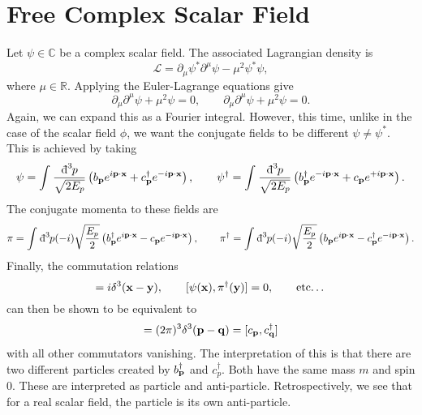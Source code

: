 \section{Free Complex Scalar Field}%
\label{sec:free_complex_scalar_field}

Let $\psi \in \mathbb{C}$ be a complex scalar field. The associated Lagrangian density is
\begin{equation}
  \mathcal{L} = \partial_\mu \psi^* \partial^\mu \psi - \mu^2 \psi^* \psi,
\end{equation}
where $\mu \in \mathbb{R}$. Applying the Euler-Lagrange equations give
\begin{equation}
  \partial_\mu \partial^\mu \psi + \mu^2 \psi = 0, \qquad \partial_\mu \partial^\mu \psi + \mu^2 \psi = 0 .
\end{equation}
Again, we can expand this as a Fourier integral. However, this time, unlike in the case of the scalar field $\phi$, we want the conjugate fields to be different $\psi \neq \psi^*$. This is achieved by taking
\begin{equation}
  \psi = \int_{}^{} \frac{\bdd[3]{p}}{\sqrt{2E_p}} \left( b_{\vb{p}}e^{i\vb{p}\cdot\vb{x}} + c^{\dagger}_{\vb{p}}e^{-i\vb{p}\cdot\vb{x}} \right), \qquad
  \psi^{\dagger} = \int_{}^{} \frac{\bdd[3]{p}}{\sqrt{2E_p}} \left( b^{\dagger}_{\vb{p}}e^{-i\vb{p}\cdot\vb{x}} + c_{\vb{p}}e^{+i\vb{p}\cdot\vb{x}} \right).
\end{equation}
The conjugate momenta to these fields are
\begin{equation}
  \pi = \int_{}^{} \bdd[3]{p} (-i) \sqrt{\frac{E_p}{2}} \left( b^{\dagger}_{\vb{p}}e^{i\vb{p}\cdot\vb{x}} - c_{\vb{p}}e^{-i\vb{p}\cdot\vb{x}} \right), \qquad
  \pi^{\dagger} = \int_{}^{} \bdd[3]{p} (-i) \sqrt{\frac{E_p}{2}} \left( b_{\vb{p}}e^{i\vb{p}\cdot\vb{x}} - c^{\dagger}_{\vb{p}}e^{-i\vb{p}\cdot\vb{x}} \right).
\end{equation}
Finally, the commutation relations
\begin{equation}
  [\psi(\vb{x}), \pi(\vb{y}) ] = i \delta^3(\vb{x}-\vb{y}),
  \qquad
  [\psi(\vb{x}), \pi^{\dagger}(\vb{y}) ] = 0 , \qquad \text{etc\ldots}
\end{equation}
can then be shown to be equivalent to 
\begin{equation}
  [b_{\vb{p}}, b^{\dagger}_{\vb{q}} ] = (2\pi)^3 \delta^3(\vb{p} - \vb{q}) = [c_{\vb{p}}, c^{\dagger}_{\vb{q}}]
\end{equation}
with all other commutators vanishing.
The interpretation of this is that there are two different particles created by $b^{\dagger}_{\vb{p}}$ and $c^{\dagger}_{p}$. Both have the same mass $m$ and spin $0$.
These are interpreted as particle and anti-particle.
Retrospectively, we see that for a real scalar field, the particle is its own anti-particle.

